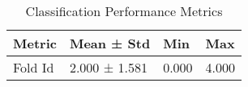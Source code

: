 
\begin{table}[htbp]
\centering
\caption{Classification Performance Metrics}
\label{tab:classification_results}
\begin{tabular}{llll}
\toprule
Metric & Mean ± Std & Min & Max \\
\midrule
Fold Id & 2.000 ± 1.581 & 0.000 & 4.000 \\
\bottomrule
\end{tabular}
\end{table}

